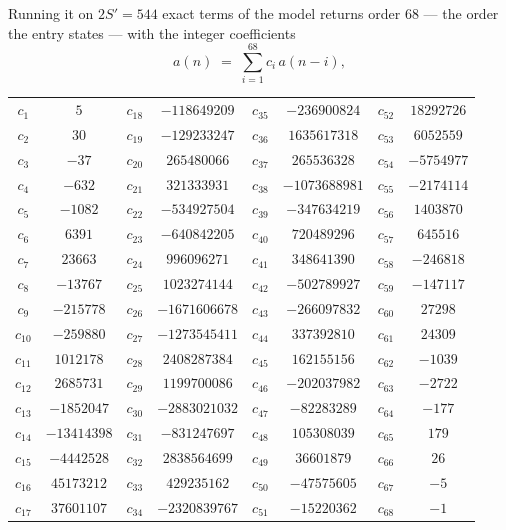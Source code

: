 \documentclass[11pt,a4paper]{article}
\theoremstyle{plain}
\theoremstyle{definition}
\begin{document}
Running it on $2S'=544$ exact terms of the model returns order $68$ --- the order the
entry states --- with the integer coefficients
\[
a(n)\;=\;\sum_{i=1}^{68}c_i\,a(n-i),
\]
\begin{center}\small
\begin{tabular}{cccccccc}
$c_{1}$ & $5$ & $c_{18}$ & $-118649209$ & $c_{35}$ & $-236900824$ & $c_{52}$ & $18292726$ \\
$c_{2}$ & $30$ & $c_{19}$ & $-129233247$ & $c_{36}$ & $1635617318$ & $c_{53}$ & $6052559$ \\
$c_{3}$ & $-37$ & $c_{20}$ & $265480066$ & $c_{37}$ & $265536328$ & $c_{54}$ & $-5754977$ \\
$c_{4}$ & $-632$ & $c_{21}$ & $321333931$ & $c_{38}$ & $-1073688981$ & $c_{55}$ & $-2174114$ \\
$c_{5}$ & $-1082$ & $c_{22}$ & $-534927504$ & $c_{39}$ & $-347634219$ & $c_{56}$ & $1403870$ \\
$c_{6}$ & $6391$ & $c_{23}$ & $-640842205$ & $c_{40}$ & $720489296$ & $c_{57}$ & $645516$ \\
$c_{7}$ & $23663$ & $c_{24}$ & $996096271$ & $c_{41}$ & $348641390$ & $c_{58}$ & $-246818$ \\
$c_{8}$ & $-13767$ & $c_{25}$ & $1023274144$ & $c_{42}$ & $-502789927$ & $c_{59}$ & $-147117$ \\
$c_{9}$ & $-215778$ & $c_{26}$ & $-1671606678$ & $c_{43}$ & $-266097832$ & $c_{60}$ & $27298$ \\
$c_{10}$ & $-259880$ & $c_{27}$ & $-1273545411$ & $c_{44}$ & $337392810$ & $c_{61}$ & $24309$ \\
$c_{11}$ & $1012178$ & $c_{28}$ & $2408287384$ & $c_{45}$ & $162155156$ & $c_{62}$ & $-1039$ \\
$c_{12}$ & $2685731$ & $c_{29}$ & $1199700086$ & $c_{46}$ & $-202037982$ & $c_{63}$ & $-2722$ \\
$c_{13}$ & $-1852047$ & $c_{30}$ & $-2883021032$ & $c_{47}$ & $-82283289$ & $c_{64}$ & $-177$ \\
$c_{14}$ & $-13414398$ & $c_{31}$ & $-831247697$ & $c_{48}$ & $105308039$ & $c_{65}$ & $179$ \\
$c_{15}$ & $-4442528$ & $c_{32}$ & $2838564699$ & $c_{49}$ & $36601879$ & $c_{66}$ & $26$ \\
$c_{16}$ & $45173212$ & $c_{33}$ & $429235162$ & $c_{50}$ & $-47575605$ & $c_{67}$ & $-5$ \\
$c_{17}$ & $37601107$ & $c_{34}$ & $-2320839767$ & $c_{51}$ & $-15220362$ & $c_{68}$ & $-1$ \\
\end{tabular}
\end{center}
\end{document}
